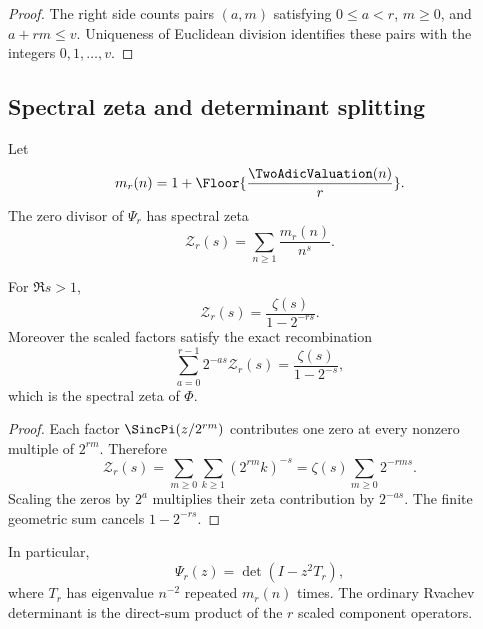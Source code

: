 \documentclass[11pt]{article}
\theoremstyle{definition}
\theoremstyle{remark}
\begin{document}
\begin{proof}
The right side counts pairs $(a,m)$ satisfying
$0\le a<r$, $m\ge0$, and $a+rm\le v$.  Uniqueness of Euclidean division
identifies these pairs with the integers $0,1,\ldots,v$.
\end{proof}

\subsection{Spectral zeta and determinant splitting}

Let
\begin{equation}
 m_r(n)=1+\Floor{\frac{\TwoAdicValuation(n)}r}.        \label{p5:eq:mr-def}
\end{equation}
The zero divisor of $\Psi_r$ has spectral zeta
\begin{equation}
 \mathcal Z_r(s)=\sum_{n\ge1}\frac{m_r(n)}{n^s}.            \label{p5:eq:Zr-def}
\end{equation}

\begin{proposition}
\label{p5:prop:sparse-spectral-zeta}
For $\Re s>1$,
\begin{equation}
 \boxed{\displaystyle
 \mathcal Z_r(s)=\frac{\zeta(s)}{1-2^{-rs}}.}               \label{p5:eq:sparse-spectral-zeta}
\end{equation}
Moreover the scaled factors satisfy the exact recombination
\begin{equation}
 \sum_{a=0}^{r-1}2^{-as}\mathcal Z_r(s)
 =\frac{\zeta(s)}{1-2^{-s}},                               \label{p5:eq:spectral-zeta-recombine}
\end{equation}
which is the spectral zeta of $\Phi$.
\end{proposition}

\begin{proof}
Each factor $\SincPi(z/2^{rm})$ contributes one zero at every nonzero multiple
of $2^{rm}$.  Therefore
\[
 \mathcal Z_r(s)
 =\sum_{m\ge0}\sum_{k\ge1}(2^{rm}k)^{-s}
 =\zeta(s)\sum_{m\ge0}2^{-rms}.
\]
Scaling the zeros by $2^a$ multiplies their zeta contribution by $2^{-as}$.
The finite geometric sum cancels $1-2^{-rs}$.
\end{proof}

In particular,
\begin{equation}
 \Psi_r(z)=\det(I-z^2T_r),                                  \label{p5:eq:Psi-determinant}
\end{equation}
where $T_r$ has eigenvalue $n^{-2}$ repeated $m_r(n)$ times.  The ordinary
Rvachev determinant is the direct-sum product of the $r$ scaled component
operators.
\end{document}
